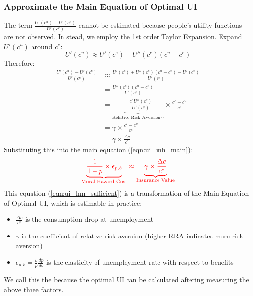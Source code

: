         \subsubsection{Approximate the Main Equation of Optimal UI}
            The term $\frac{U'(c^u)-U'(c^e)}{U'(c^e)}$ cannot be estimated because people's utility functions are not observed. In stead, we employ the 1st order Taylor Expansion. Expand $U'(c^u)$ around $c^e$:
            $$U'(c^u) \approx U'(c^e) + U''(c^e)(c^u-c^e)$$
            Therefore:
            \begin{equation*}
                \begin{split}
                \frac{U'(c^u)-U'(c^e)}{U'(c^e)} & \approx \frac{U'(c^e) + U''(c^e)(c^u-c^e)-U'(c^e)}{U'(c^e)}\\
                & = \frac{U''(c^e)(c^u-c^e)}{U'(c^e)}\\
                & = \underbrace{-\frac{c^e U''(c^e)}{U'(c^e)}}_{\text{Relative\ Risk\ Aversion}\ \gamma} \times \frac{c^e-c^u}{c^e}\\
                & = \gamma \times \frac{c^e-c^u}{c^e}\\
                & = \gamma \times \frac{\Delta c}{c^e}
            \end{split}
            \end{equation*}
            Substituting this into the main equation (\ref{eqn:ui_mh_main}):
            \begin{equation}
            \label{eqn:ui_hm_sufficient}
            \color{red}
                \underbrace{\frac{1}{1-p}\times{\epsilon_{p,b}}}_{\text{Moral\ Hazard\ Cost}} \approx \underbrace{\gamma \times \frac{\Delta c}{c^e}}_{\text{Insurance\ Value}}
            \end{equation}
            This equation (\ref{eqn:ui_hm_sufficient}) is a transformation of the Main Equation of Optimal UI, which is estimable in practice:
            \begin{itemize}
                \item $\frac{\Delta c}{c^e}$ is the consumption drop at unemployment
                \item $\gamma$ is the coefficient of relative risk aversion (higher RRA indicates more risk aversion)
                \item $\epsilon_{p,b} = \frac{b}{p}\frac{dp}{db}$ is the elasticity of unemployment rate with respect to benefits
            \end{itemize}
            We call this the  because the optimal UI can be calculated aftering measuring the above three factors.
            

